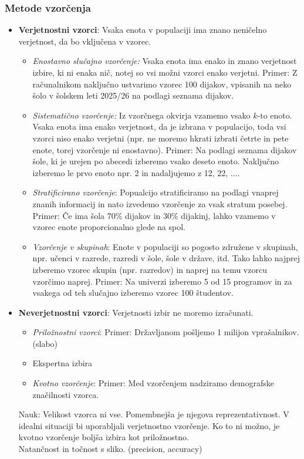 \subsubsection*{Metode vzorčenja}
\begin{itemize}
    \item \textbf{Verjetnostni vzorci}: Vsaka enota v populaciji ima znano neničelno verjetnost, da bo vključena v vzorec.
    \begin{itemize}
        \item \textit{Enostavno slučajno vzorčenje:} Vsaka enota ima enako in znano verjetnost izbire, ki ni enaka nič, notej so vsi možni vzorci enako verjetni. Primer: Z računalnikom naključno ustvarimo vzorec 100 dijakov, vpisanih na neko šolo v šolskem leti 2025/26 na podlagi seznama dijakov.
        \item \textit{Sistematično vzorčenje:} Iz vzorčnega okvirja vzamemo vsako $k$-to enoto. Vsaka enota ima enako verjetnost, da je izbrana v populacijo, toda vsi vzorci niso enako verjetni (npr. ne moremo hkrati izbrati četrte in pete enote, torej vzorčenje ni enostavno). Primer: Na podlagi seznama dijakov šole, ki je urejen po abecedi izberemo vsako deseto enoto. Naključno izberemo le prvo enoto npr. 2 in nadaljujemo z 12, 22, ....
        \item \textit{Stratificirano vzorčenje}: Popualcijo stratificiramo na podlagi vnaprej znanih informacij in nato izvedemo vzorčenje za vsak stratum posebej. Primer: Če ima šola 70\% dijakov in 30\% dijakinj, lahko vzamemo v vzorec enote proporcionalno glede na spol.
        \item \textit{Vzorčenje v skupinah}: Enote v populaciji so pogosto združene v skupinah, npr. učenci v razrede, razredi v šole, šole v države, itd. Tako lahko najprej izberemo vzorec skupin (npr. razredov) in naprej na temu vzorcu vzorčimo naprej. Primer: Na univerzi izberemo 5 od 15 programov in za vsakega od teh slučajno izberemo vzorec 100 študentov.
    \end{itemize}
    \item \textbf{Neverjetnostni vzorci}: Verjetnosti izbir ne moremo izračunati.
    \begin{itemize}
        \item \textit{Priložnostni vzorci}: Primer: Državljanom pošljemo 1 milijon vprašalnikov. (slabo)
        \item Ekspertna izbira
        \item \textit{Kvotno vzorčenje}: Primer: Med vzorčenjem nadziramo demografske značilnosti vzorca.
    \end{itemize}
    Nauk: Velikost vzorca ni vse. Pomembnejša je njegova reprezentativnost. V idealni situaciji bi uporabljali verjetnostno vzorčenje. Ko to ni možno, je kvotno vzorčenje boljša izbira kot priložnostno.\\
    Natančnost in točnost s sliko. (precision, accuracy)
\end{itemize}
